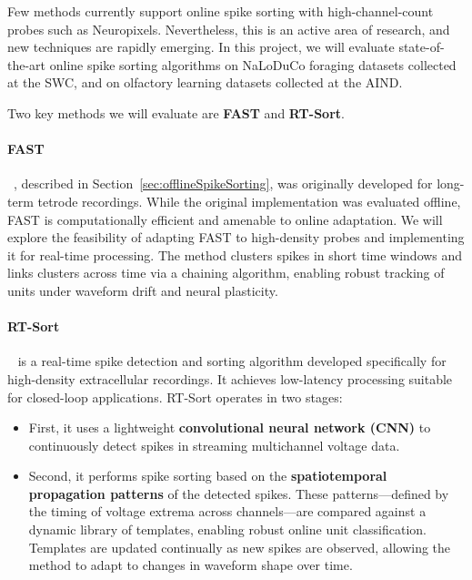Few methods currently support online spike sorting with high-channel-count probes such as Neuropixels. Nevertheless, this is an active area of research, and new techniques are rapidly emerging. In this project, we will evaluate state-of-the-art online spike sorting algorithms on NaLoDuCo foraging datasets collected at the SWC, and on olfactory learning datasets collected at the AIND.

Two key methods we will evaluate are \textbf{FAST} and \textbf{RT-Sort}.

\paragraph{FAST}~\citep{dhawaleEtAl17}, described in Section~\ref{sec:offlineSpikeSorting}, was originally developed for long-term tetrode recordings. While the original implementation was evaluated offline, FAST is computationally efficient and amenable to online adaptation. We will explore the feasibility of adapting FAST to high-density probes and implementing it for real-time processing. The method clusters spikes in short time windows and links clusters across time via a chaining algorithm, enabling robust tracking of units under waveform drift and neural plasticity.

\paragraph{RT-Sort}~\citep{vanDerMolenEtAl24} is a real-time spike detection and sorting algorithm developed specifically for high-density extracellular recordings. It achieves low-latency processing suitable for closed-loop applications. RT-Sort operates in two stages:

\begin{itemize}
    \item First, it uses a lightweight \textbf{convolutional neural network (CNN)} to continuously detect spikes in streaming multichannel voltage data.
    \item Second, it performs spike sorting based on the \textbf{spatiotemporal propagation patterns} of the detected spikes. These patterns—defined by the timing of voltage extrema across channels—are compared against a dynamic library of templates, enabling robust online unit classification. Templates are updated continually as new spikes are observed, allowing the method to adapt to changes in waveform shape over time.
\end{itemize}


